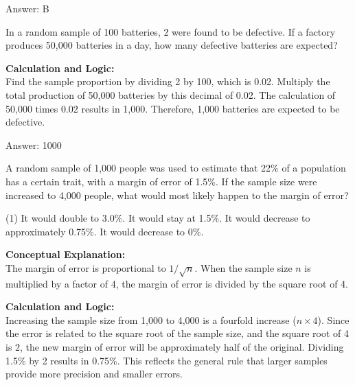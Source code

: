 \documentclass[11pt,paper=a4,answers]{exam}
\begin{document}
\begin{questions}
\begin{solution}
\vspace{30pt}

Answer: \colorbox{yellow!100}{B}
\end{solution}

\vspace{60pt}

\question
In a random sample of 100 batteries, 2 were found to be defective. If a factory produces 50,000 batteries in a day, how many defective batteries are expected?

\begin{solution}
\textbf{Calculation and Logic:} \\
Find the sample proportion by dividing 2 by 100, which is 0.02. Multiply the total production of 50,000 batteries by this decimal of 0.02. The calculation of 50,000 times 0.02 results in 1,000. Therefore, 1,000 batteries are expected to be defective.

\vspace{30pt}

Answer: \colorbox{yellow!100}{1000}
\end{solution}

\vspace{60pt}

\question
A random sample of 1,000 people was used to estimate that 22\% of a population has a certain trait, with a margin of error of 1.5\%. If the sample size were increased to 4,000 people, what would most likely happen to the margin of error?
\begin{tasks}(1)
    \task It would double to 3.0\%.
    \task It would stay at 1.5\%.
    \task It would decrease to approximately 0.75\%.
    \task It would decrease to 0\%.
\end{tasks}

\begin{solution}
\textbf{Conceptual Explanation:} \\
The margin of error is proportional to $1/\sqrt{n}$. When the sample size $n$ is multiplied by a factor of 4, the margin of error is divided by the square root of 4.

\vspace{30pt}

\textbf{Calculation and Logic:} \\
Increasing the sample size from 1,000 to 4,000 is a fourfold increase ($n \times 4$). Since the error is related to the square root of the sample size, and the square root of 4 is 2, the new margin of error will be approximately half of the original. Dividing 1.5\% by 2 results in 0.75\%. This reflects the general rule that larger samples provide more precision and smaller errors.


\end{solution}
\end{questions}
\end{document}
